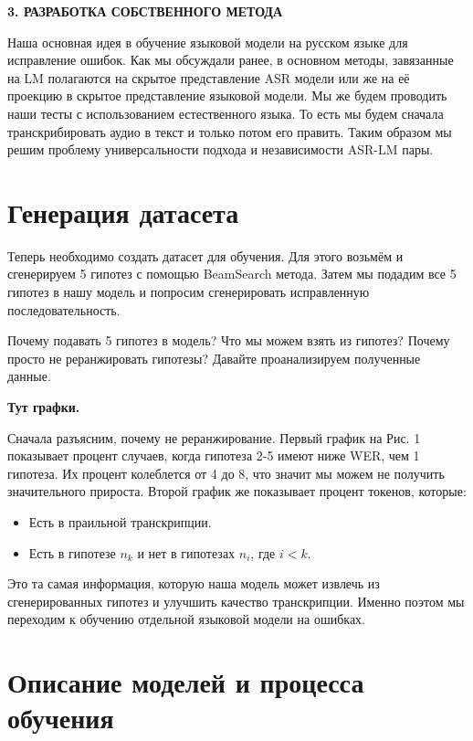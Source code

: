 \newpage
\begin{center}
  \textbf{\large 3. РАЗРАБОТКА СОБСТВЕННОГО МЕТОДА}
\end{center}

Наша основная идея в обучение языковой модели на русском языке для исправление ошибок.
Как мы обсуждали ранее, в основном методы, завязанные на LM полагаются на скрытое представление ASR модели или же на её проекцию в скрытое представление языковой модели.
Мы же будем проводить наши тесты с использованием естественного языка.
То есть мы будем сначала транскрибировать аудио в текст и только потом его править.
Таким образом мы решим проблему универсальности подхода и независимости ASR-LM пары.

\section{Генерация датасета}
Теперь необходимо создать датасет для обучения.
Для этого возьмём и сгенерируем 5 гипотез с помощью BeamSearch метода.
Затем мы подадим все 5 гипотез в нашу модель и попросим сгенерировать исправленную последовательность.

Почему подавать 5 гипотез в модель? Что мы можем взять из гипотез?
Почему просто не реранжировать гипотезы?
Давайте проанализируем полученные данные.

\textbf{Тут графки.}

Сначала разъясним, почему не реранжирование.
Первый график на Рис. 1 показывает процент случаев, когда гипотеза 2-5 имеют ниже WER, чем 1 гипотеза.
Их процент колеблется от 4 до 8, что значит мы можем не получить значительного прироста.
Второй график же показывает процент токенов, которые:
\begin{itemize}
  \item Есть в праильной транскрипции.
  \item Есть в гипотезе $n_k$ и нет в гипотезах $n_i$, где $i < k$.
\end{itemize}

Это та самая информация, которую наша модель может извлечь из сгенерированных гипотез и улучшить качество транскрипции.
Именно поэтом мы переходим к обучению отдельной языковой модели на ошибках.

\section{Описание моделей и процесса обучения}

